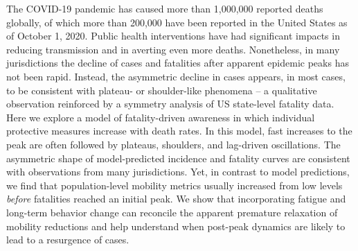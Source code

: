 The COVID-19 pandemic has caused more than 1,000,000 reported deaths globally, of which more than 200,000 have been reported in the United States as of October 1, 2020. 
Public health interventions have had significant impacts in reducing transmission and in averting even more deaths. 
Nonetheless, in many jurisdictions the decline of cases and fatalities after apparent epidemic peaks has not been rapid.  
Instead, the asymmetric decline in cases appears, in most cases, to be consistent with plateau- or shoulder-like phenomena -- a qualitative observation reinforced by a symmetry analysis of US state-level fatality data.  
Here we explore a model of fatality-driven awareness in which individual protective measures increase with death rates.  
In this model, fast increases to the peak are often followed by plateaus, shoulders, and lag-driven oscillations. 
The asymmetric shape of model-predicted incidence and fatality curves are consistent with observations from many jurisdictions. 
Yet, in contrast to model predictions, we find that population-level mobility metrics usually increased from low levels \emph{before} fatalities reached an initial peak.  
We show that incorporating fatigue and long-term behavior change can reconcile the apparent premature relaxation of mobility reductions and help understand when post-peak dynamics are likely to lead to a resurgence of cases.
